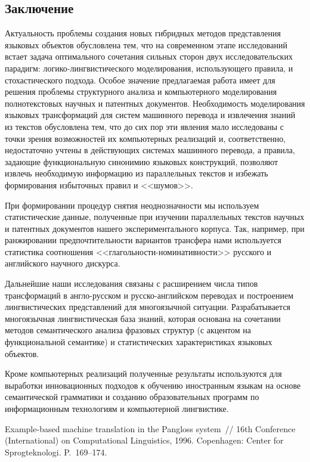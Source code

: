 \begin{multicols}{2}
\section{Заключение}

Актуальность проблемы создания новых гиб\-рид\-ных методов
представления языковых объектов обусловлена тем, что на современном
этапе исследований встает задача оптимального сочетания сильных сторон
двух исследовательских парадигм: логико-лингвистического моделирования,
использующего правила, и стохастического подхода. Особое значение
предлагаемая работа имеет для решения проблемы структурного анализа и
компьютерного моделирования полнотекстовых научных и патентных
документов. Необходимость моделирования языковых трансформаций для
систем машинного перевода и извлечения знаний из текстов обусловлена
тем, что до сих пор эти явления мало исследованы с точки зрения
возможностей их компьютерных реализаций и, соответственно, недостаточно
учтены в действующих системах машинного перевода, а правила, задающие функциональную
синонимию языковых конструкций, позволяют извлечь необходимую
информацию из параллельных текстов и избежать формирования
избыточных правил и <<шумов>>.

При формировании процедур снятия неоднозначности мы используем статистические 
данные, полученные при изучении параллельных текстов научных и патентных 
документов нашего экспериментального корпуса. Так, например, при ранжировании 
предпочтительности вариантов трансфера нами используется статистика соотношения 
<<гла\-голь\-но\-сти-но\-ми\-на\-тив\-но\-сти>> русского и английского научного 
дискурса.

Дальнейшие наши исследования связаны с расширением числа типов трансформаций в 
анг\-ло-рус\-ском и рус\-ско-анг\-лий\-ском переводах и построением 
лингвистических представлений для многоязычной ситуации. Разрабатывается 
многоязычная лингвистическая база знаний, которая основана на сочетании методов 
семантического анализа фразовых структур (с акцентом на функциональной 
семантике) и статистических характеристиках языковых объектов.

Кроме компьютерных реализаций полученные результаты используются
для выработки инновационных подходов к обучению иностранным языкам
на основе семантической грамматики и созданию образовательных программ
по информационным технологиям и компьютерной лингвистике.

{\small\frenchspacing
{%
\begin{thebibliography}{99}
Example-based machine translation in the Pangloss system~//
16th Conference (International) on Computational
Linguistics, 1996. Copenhagen: Center for Sprogteknologi. P.~169--174.


\end{thebibliography}}}
\end{multicols}
